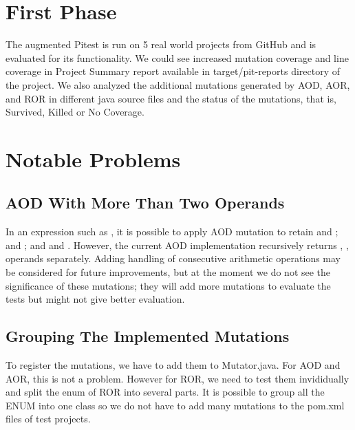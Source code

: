 \section{First Phase}





The augmented Pitest is run on 5 real world projects from GitHub and is evaluated for its functionality.
We could see increased mutation coverage and line coverage in Project Summary report available in target/pit-reports directory of the project.
We also analyzed the additional mutations generated by AOD, AOR, and ROR in different java source files and the status of the mutations, that is, Survived, Killed or No Coverage.

\section{Notable Problems}
\subsection{AOD With More Than Two Operands}
In an expression such as , it is possible to apply AOD mutation to retain  and ;  and ; and  and .
However, the current AOD implementation recursively returns , ,  operands separately.
Adding handling of consecutive arithmetic operations may be considered for future improvements, but at the moment we do not see the significance of these mutations;
they will add more mutations to evaluate the tests but might not give better evaluation.

\subsection{Grouping The Implemented Mutations}
To register the mutations, we have to add them to Mutator.java. For AOD and AOR, this is not a problem. However for ROR, we need to test them invididually and split the enum of ROR into several parts. It is possible to group all the ENUM into one class so we do not have to add many mutations to the pom.xml files of test projects.

